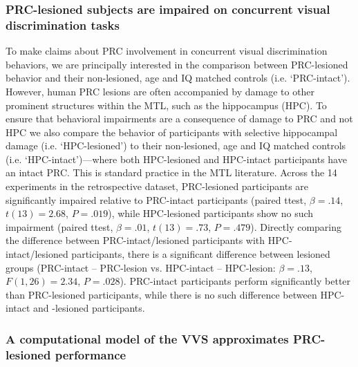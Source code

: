 \documentclass[11pt]{article}
\begin{document}
\subsubsection{PRC-lesioned subjects are impaired on concurrent visual discrimination tasks}

To make claims about PRC involvement in concurrent visual discrimination behaviors, we are principally interested in the comparison between PRC-lesioned behavior and their non-lesioned, age and IQ matched controls (i.e. `PRC-intact'). However, human PRC lesions are often accompanied by damage to other prominent structures within the MTL, such as the hippocampus (HPC). To ensure that behavioral impairments are a consequence of damage to PRC and not HPC we also compare the behavior of participants with selective hippocampal damage (i.e. `HPC-lesioned') to their non-lesioned, age and IQ matched controls (i.e. `HPC-intact')---where both HPC-lesioned and HPC-intact participants have an intact PRC. This is standard practice in the MTL literature. Across the 14 experiments in the retrospective dataset, PRC-lesioned participants are significantly impaired relative to PRC-intact participants (paired ttest, $\beta = .14$, $t(13) = 2.68$, $P = .019$), while HPC-lesioned participants show no such impairment (paired ttest, $\beta = .01$, $t(13) = .73$, $P = .479$). Directly comparing the difference between PRC-intact/lesioned participants with HPC-intact/lesioned participants, there is a significant difference between lesioned groups (PRC-intact -- PRC-lesion vs. HPC-intact -- HPC-lesion: $\beta = .13$, $F(1, 26) = 2.34$, $P = .028$). PRC-intact participants perform significantly better than PRC-lesioned participants, while there is no such difference between HPC-intact and -lesioned participants. 

\subsubsection{A computational model of the VVS approximates PRC-lesioned performance}
\end{document}
